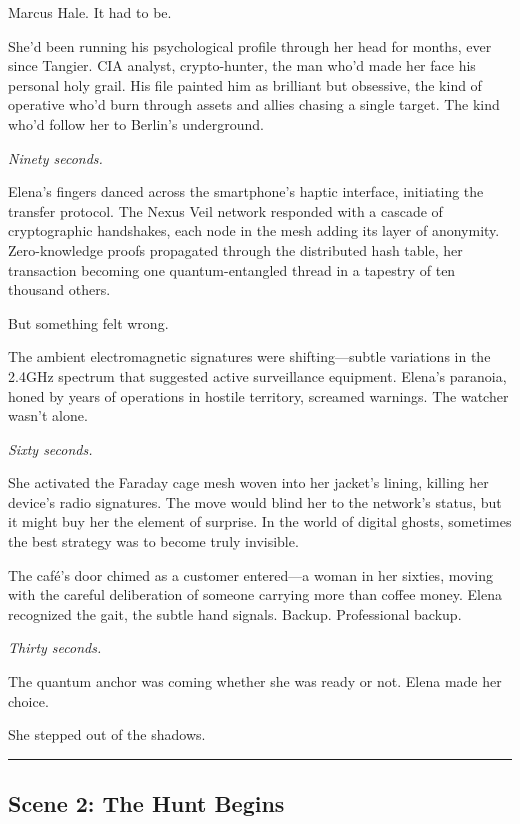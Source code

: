 Marcus Hale. It had to be.

She'd been running his psychological profile through her head for months, ever since Tangier. CIA analyst, crypto-hunter, the man who'd made her face his personal holy grail. His file painted him as brilliant but obsessive, the kind of operative who'd burn through assets and allies chasing a single target. The kind who'd follow her to Berlin's underground.

\emph{Ninety seconds.}

Elena's fingers danced across the smartphone's haptic interface, initiating the transfer protocol. The Nexus Veil network responded with a cascade of cryptographic handshakes, each node in the mesh adding its layer of anonymity. Zero-knowledge proofs propagated through the distributed hash table, her transaction becoming one quantum-entangled thread in a tapestry of ten thousand others.

But something felt wrong.

The ambient electromagnetic signatures were shifting---subtle variations in the 2.4GHz spectrum that suggested active surveillance equipment. Elena's paranoia, honed by years of operations in hostile territory, screamed warnings. The watcher wasn't alone.

\emph{Sixty seconds.}

She activated the Faraday cage mesh woven into her jacket's lining, killing her device's radio signatures. The move would blind her to the network's status, but it might buy her the element of surprise. In the world of digital ghosts, sometimes the best strategy was to become truly invisible.

The café's door chimed as a customer entered---a woman in her sixties, moving with the careful deliberation of someone carrying more than coffee money. Elena recognized the gait, the subtle hand signals. Backup. Professional backup.

\emph{Thirty seconds.}

The quantum anchor was coming whether she was ready or not. Elena made her choice.

She stepped out of the shadows.

\begin{center}\rule{0.5\linewidth}{0.5pt}\end{center}

\hypertarget{scene-2-the-hunt-begins}{%
\subsection{Scene 2: The Hunt Begins}\label{scene-2-the-hunt-begins}}

